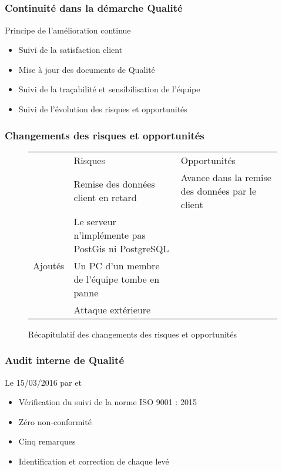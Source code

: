
\speaker{\Pierre}

\subsection{} %


\begin{frame}
\frametitle{Continuité dans la démarche Qualité}
\begin{block}{Principe de l'amélioration continue}
\begin{itemize}
\item Suivi de la satisfaction client
\item Mise à jour des documents de Qualité
\item Suivi de la traçabilité et sensibilisation de l'équipe
\item Suivi de l'évolution des risques et opportunités
\end{itemize}
\end{block}
\end{frame}




\begin{frame}
\frametitle{Changements des risques et opportunités}
\begin{figure}
\begin{longtable}{|p{1.5cm}||p{3.5cm}|p{3.5cm}|}
\hline
 & \small Risques & \small Opportunités \\\hhline{|=||=|=|}
\multirow{3}{*}{\small Supprimés} & \small Remise des données client en retard & \small Avance dans la remise des données par le client \\\hline

\multirow{3}{*}{\small Ajoutés} & \small Le serveur n’implémente pas PostGis ni PostgreSQL & \\ \cline{2-2}
 & \small Un PC d’un membre de l’équipe tombe en panne & \\\cline{2-2}
 &  \small Attaque extérieure & \\\hline


\end{longtable}
\caption{Récapitulatif des changements des risques et opportunités}
\end{figure}
\end{frame}



\begin{frame}
\frametitle{Audit interne de Qualité}
\begin{block}{Le 15/03/2016 par \nomApprobateur{} et \nomTuteurQualite{}}
\begin{itemize}
\item Vérification du suivi de la norme ISO 9001 : 2015
\item Zéro non-conformité
\item Cinq remarques
\item Identification et correction de chaque \FT{} levé
\end{itemize}
\end{block}
\end{frame}





